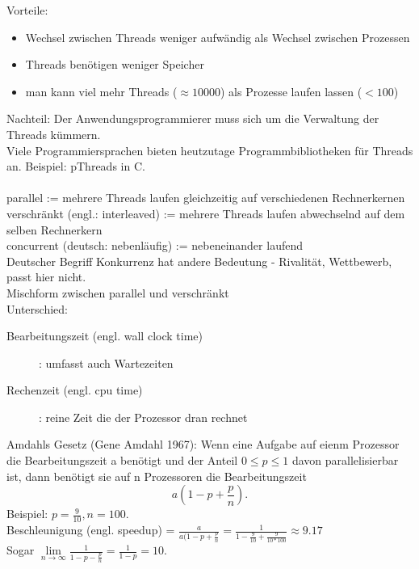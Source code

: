 \documentclass[a4paper,12pt]{scrartcl}
\begin{document}
Vorteile:
\begin{itemize}
 \item Wechsel zwischen Threads weniger aufwändig als Wechsel zwischen Prozessen
 \item Threads benötigen weniger Speicher 
 \item man kann viel mehr Threads ($\approx 10000$) als Prozesse laufen lassen ($< 100$)
\end{itemize}

Nachteil: Der Anwendungsprogrammierer muss sich um die Verwaltung der Threads kümmern.\\
Viele Programmiersprachen bieten heutzutage Programmbibliotheken für Threads an. Beispiel: pThreads in C.\\
\\
parallel := mehrere Threads laufen gleichzeitig auf verschiedenen Rechnerkernen\\
verschränkt (engl.: interleaved) := mehrere Threads laufen abwechselnd auf dem selben Rechnerkern\\
concurrent (deutsch: \glqq{}nebenläufig\grqq{}) := nebeneinander laufend \\
Deutscher Begriff \glqq{}Konkurrenz\grqq{} hat andere Bedeutung - Rivalität, Wettbewerb, passt hier nicht.\\
Mischform zwischen parallel und verschränkt\\
Unterschied: 
\begin{description}
 \item[Bearbeitungszeit (engl. wall clock time)]: umfasst auch Wartezeiten
 \item[Rechenzeit (engl. cpu time)]: reine Zeit die der Prozessor dran rechnet
\end{description}

Amdahls Gesetz (Gene Amdahl 1967): Wenn eine Aufgabe auf eienm Prozessor die Bearbeitungszeit a benötigt und der Anteil $0\leq p\leq1$ davon parallelisierbar ist, dann benötigt sie auf n Prozessoren die Bearbeitungszeit
$$a(1-p+\frac{p}{n})\text{.}$$
Beispiel: $p=\frac{9}{10}, n=100$.\\
Beschleunigung (engl. speedup) = $\frac{a}{a(1-p+\frac{p}{n}} = \frac{1}{1-\frac{9}{10}+\frac{9}{10*100}} \approx 9.17$\\
Sogar $\underset{n\rightarrow\infty}{\lim }\frac{1}{1-p-\frac{p}{n}} = \frac{1}{1-p} = 10$.
\end{document}
